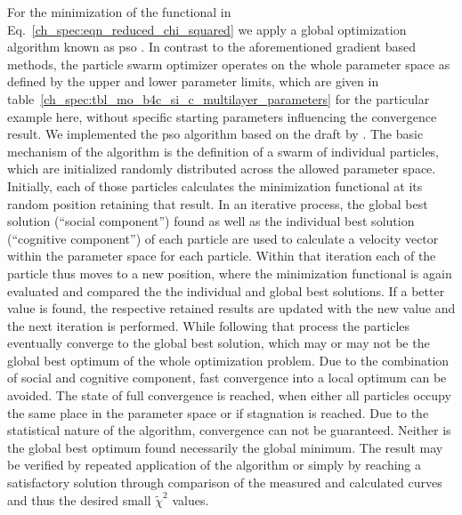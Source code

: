 For the minimization of the functional in Eq.~\eqref{ch_spec:eqn_reduced_chi_squared} we apply a global optimization algorithm known as \gls{pso} \cite{kennedy_particle_2011}. In contrast to the aforementioned gradient based methods, the particle swarm optimizer operates on the whole parameter space as defined by the upper and lower parameter limits, which are given in table~\ref{ch_spec:tbl_mo_b4c_si_c_multilayer_parameters} for the particular example here, without specific starting parameters influencing the convergence result. We implemented the \gls{pso} algorithm based on the draft by \textcite{carlisle_off--shelf_2001}. The basic mechanism of the algorithm is the definition of a swarm of individual particles, which are initialized randomly distributed across the allowed parameter space. Initially, each of those particles calculates the minimization functional at its random position retaining that result. In an iterative process, the global best solution (``social component'') found as well as the individual best solution (``cognitive component'') of each particle are used to calculate a velocity vector within the parameter space for each particle. Within that iteration each of the particle thus moves to a new position, where the minimization functional is again evaluated and compared the the individual and global best solutions. If a better value is found, the respective retained results are updated with the new value and the next iteration is performed. While following that process the particles eventually converge to the global best solution, which may or may not be the global best optimum of the whole optimization problem. Due to the combination of social and cognitive component, fast convergence into a local optimum can be avoided. The state of full convergence is reached, when either all particles occupy the same place in the parameter space or if stagnation is reached. Due to the statistical nature of the algorithm, convergence can not be guaranteed. Neither is the global best optimum found necessarily the global minimum. The result may be verified by repeated application of the algorithm or simply by  reaching a satisfactory solution through comparison of the measured and calculated curves and thus the desired small $\tilde{\chi}^2$ values.

